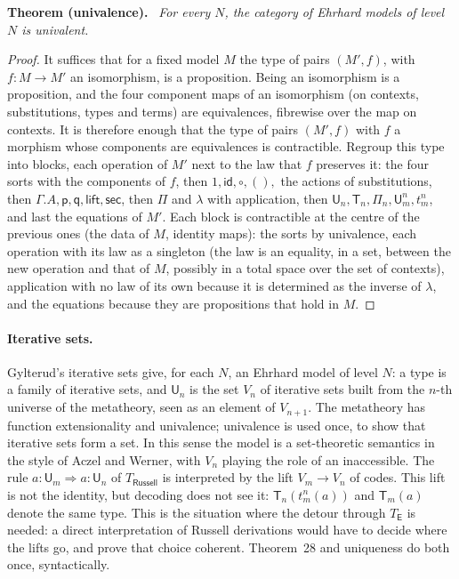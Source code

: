 \documentclass[11pt]{article}
\newenvironment{theorem}[1]{\par\medskip\noindent\textbf{Theorem #1.}\ \itshape}{\par\medskip}
\theoremstyle{definition}
\theoremstyle{remark}
\newcommand{\U}{\mathsf U}
\newcommand{\T}{\mathsf T}
\newcommand{\p}{\mathsf p}
\newcommand{\q}{\mathsf q}
\newcommand{\id}{\mathsf{id}}
\newcommand{\lift}{\mathsf{lift}}
\newcommand{\sect}{\mathsf{sec}}
\begin{document}
\begin{theorem}{(univalence)}
For every $N$, the category of Ehrhard models of level $N$ is univalent.
\end{theorem}
\begin{proof}
It suffices that for a fixed model $M$ the type of pairs $(M',f)$, with
$f:M\to M'$ an isomorphism, is a proposition. Being an isomorphism is a
proposition, and the four component maps of an isomorphism (on contexts,
substitutions, types and terms) are equivalences, fibrewise over the map
on contexts. It is therefore enough that the type of pairs $(M',f)$ with
$f$ a morphism whose components are equivalences is contractible. Regroup
this type into blocks, each operation of $M'$ next to the law that $f$
preserves it: the four sorts with the components of $f$, then
$1,\id,\circ,(),$ the actions of substitutions, then $\Gamma.A,\p,\q,\lift,
\sect$, then $\Pi$ and $\lambda$ with application, then $\U_n,\T_n,\Pi_n,
\U^n_m,t^n_m$, and last the equations of $M'$. Each block is contractible
at the centre of the previous ones (the data of $M$, identity maps):
the sorts by univalence, each operation with its law as a singleton (the
law is an equality, in a set, between the new operation and that of $M$,
possibly in a total space over the set of contexts), application with no
law of its own because it is determined as the inverse of $\lambda$, and
the equations because they are propositions that hold in $M$.
\end{proof}

\paragraph{Iterative sets.} Gylterud's iterative sets give, for each $N$,
an Ehrhard model of level $N$: a type is a family of iterative sets, and
$\U_n$ is the set $V_n$ of iterative sets built from the $n$-th universe of
the metatheory, seen as an element of $V_{n+1}$. The metatheory has
function extensionality and univalence; univalence is used once, to show
that iterative sets form a set. In this sense the model is a
set-theoretic semantics in the style of Aczel and Werner, with $V_n$
playing the role of an inaccessible. The rule $a:\U_m\Rightarrow a:\U_n$ of
$T_{\mathsf{Russell}}$ is interpreted by the lift $V_m\to V_n$ of codes.
This lift is not the identity, but decoding does not see it:
$\T_n(t^n_m(a))$ and $\T_m(a)$ denote the same type. This is the situation
where the detour through $T_{\mathsf E}$ is needed: a direct interpretation
of Russell derivations would have to decide where the lifts go, and prove
that choice coherent. Theorem~28 and uniqueness do both once,
syntactically.
\end{document}
